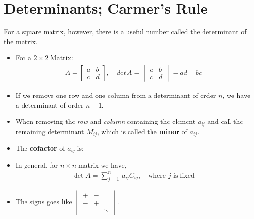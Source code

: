         \section{Determinants; Carmer's Rule}
            For a square matrix, however, there is a useful number called the determinant of the matrix.
            \begin{itemize}
                \item For a $2\times2$ Matrix:
                \begin{align} \label{det of 2by2 matrix}
                    A= \begin{bmatrix}
                        a & b \\
                        c & d
                    \end{bmatrix}, \quad
                    det\, A = \begin{vmatrix}
                        a & b \\
                        c & d
                    \end{vmatrix} =ad-bc
                \end{align}
                \item If we remove one row and one column from a determinant of order $n$, 
                    we have a determinant of order $n-1$.
                \item When removing the \textit{row} and \textit{column} containing the element $a_{ij}$ and call the 
                    remaining determinant $M_{ij}$, which is called the \textbf{minor} of $a_{ij}$.
                \item The \textbf{cofactor} of $a_{ij}$ is: 
                \item In general, for $n \times n$ matrix we have,
                \begin{align}
                    \label{eq:general det of nXn matrix}
                    \det{A} = \sum_{j=1}^n\, a_{ij}C_{ij}, \quad \text{where $j$ is fixed}
                \end{align}
                \item The signs goes like $\begin{vmatrix}
                    + & - &  \\
                    - & + &  \\
                    &   &  \ddots
                \end{vmatrix}$.
            \end{itemize}

